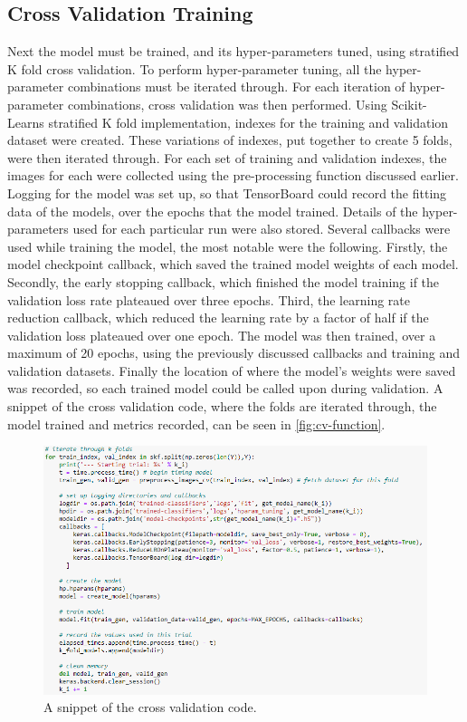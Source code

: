 \subsection{Cross Validation Training}
Next the model must be trained, and its hyper-parameters tuned, using stratified K fold cross validation. To perform hyper-parameter tuning, all the hyper-parameter combinations must be iterated through. For each iteration of hyper-parameter combinations, cross validation was then performed. Using Scikit-Learns stratified K fold implementation, indexes for the training and validation dataset were created. These variations of indexes, put together to create 5 folds, were then iterated through. For each set of training and validation indexes, the images for each were collected using the pre-processing function discussed earlier. Logging for the model was set up, so that TensorBoard could record the fitting data of the models, over the epochs that the model trained. Details of the hyper-parameters used for each particular run were also stored. Several callbacks were used while training the model, the most notable were the following. Firstly, the model checkpoint callback, which saved the trained model weights of each model. Secondly, the early stopping callback, which finished the model training if the validation loss rate plateaued over three epochs. Third, the learning rate reduction callback, which reduced the learning rate by a factor of half if the validation loss plateaued over one epoch. The model was then trained, over a maximum of 20 epochs, using the previously discussed callbacks and training and validation datasets. Finally the location of where the model's weights were saved was recorded, so each trained model could be called upon during validation. A snippet of the cross validation code, where the folds are iterated through, the model trained and metrics recorded, can be seen in \autoref{fig:cv-function}.

\begin{figure}[H]
    \centering
    \includegraphics[width=\textwidth]{figures/cv-code.png}
    \caption{A snippet of the cross validation code.}
    \label{fig:cv-function}
\end{figure}

